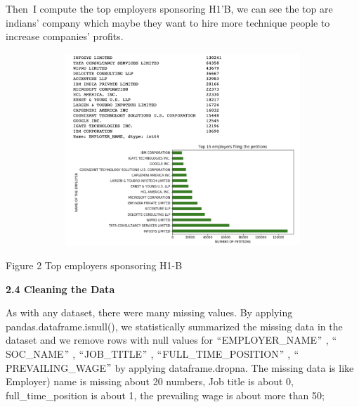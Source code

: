 \documentclass[12pt]{article}
\begin{document}
\begin{justify}
Then\ I compute the top employers sponsoring H1’B, we can see the top are indians’ company which maybe they want to  hire more technique people to increase companies’ profits. 
\end{justify}\par


\vspace{\baselineskip}



\begin{figure}[H]
	\begin{Center}
		\includegraphics[width=6.5in,height=2.85in]{./media/image11.png}
	\end{Center}
\end{figure}



\par

\begin{Center}
{\fontsize{8pt}{9.6pt}\selectfont Figure 2 Top employers sponsoring H1-B\par}
\end{Center}\par


\vspace{\baselineskip}
\begin{justify}
\textbf{2.4 Cleaning the Data}
\end{justify}\par

\begin{justify}
As with any dataset, there were many missing values. By applying pandas.dataframe.isnull(), we statistically summarized the missing data in the dataset and we remove rows with null values for $``$EMPLOYER\_NAME$"$ , $``$SOC\_NAME$"$ , $``$JOB\_TITLE$"$ , $``$FULL\_TIME\_POSITION$"$ , $``$PREVAILING\_WAGE$"$  by applying dataframe.dropna. The missing data is like Employer) name is missing about 20 numbers, Job title is about 0, full\_time\_position is about 1, the prevailing wage is about more than 50;
\end{justify}\par
\end{document}

